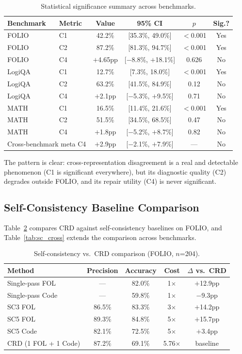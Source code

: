 \documentclass[11pt]{article}
\begin{document}
\begin{table}[t]
\centering
\caption{Statistical significance summary across benchmarks.}
\label{tab:significance}
\small
\begin{tabular}{llcccc}
\toprule
Benchmark & Metric & Value & 95\% CI & $p$ & Sig.? \\
\midrule
FOLIO  & C1 & 42.2\% & [35.3\%, 49.0\%] & $<$0.001 & Yes \\
FOLIO  & C2 & 87.2\% & [81.3\%, 94.7\%] & $<$0.001 & Yes \\
FOLIO  & C4 & $+$4.65pp & [$-$8.8\%, $+$18.1\%] & 0.626 & No \\
\midrule
LogiQA & C1 & 12.7\% & [7.3\%, 18.0\%] & $<$0.001 & Yes \\
LogiQA & C2 & 63.2\% & [41.5\%, 84.9\%] & 0.12 & No \\
LogiQA & C4 & $+$2.1pp & [$-$5.3\%, $+$9.5\%] & 0.71 & No \\
\midrule
MATH   & C1 & 16.5\% & [11.4\%, 21.6\%] & $<$0.001 & Yes \\
MATH   & C2 & 51.5\% & [34.5\%, 68.5\%] & 0.47 & No \\
MATH   & C4 & $+$1.8pp & [$-$5.2\%, $+$8.7\%] & 0.82 & No \\
\midrule
\multicolumn{2}{l}{Cross-benchmark meta C4} & $+$2.9pp & [$-$2.1\%, $+$7.9\%] & --- & No \\
\bottomrule
\end{tabular}
\end{table}

The pattern is clear: cross-representation disagreement is a real and detectable phenomenon (C1 is significant everywhere), but its diagnostic quality (C2) degrades outside FOLIO, and its repair utility (C4) is never significant.

\subsection{Self-Consistency Baseline Comparison}

Table~\ref{tab:sc_folio} compares CRD against self-consistency baselines on FOLIO, and Table~\ref{tab:sc_cross} extends the comparison across benchmarks.

\begin{table}[t]
\centering
\caption{Self-consistency vs.\ CRD comparison (FOLIO, $n$=204).}
\label{tab:sc_folio}
\begin{tabular}{lcccc}
\toprule
Method & Precision & Accuracy & Cost & $\Delta$ vs.\ CRD \\
\midrule
Single-pass FOL  & --- & 82.0\% & 1$\times$ & $+$12.9pp \\
Single-pass Code & --- & 59.8\% & 1$\times$ & $-$9.3pp \\
SC3 FOL          & 86.5\% & 83.3\% & 3$\times$ & $+$14.2pp \\
SC5 FOL          & 89.3\% & 84.8\% & 5$\times$ & $+$15.7pp \\
SC5 Code         & 82.1\% & 72.5\% & 5$\times$ & $+$3.4pp \\
CRD (1 FOL + 1 Code) & 87.2\% & 69.1\% & 5.76$\times$ & baseline \\
\bottomrule
\end{tabular}
\end{table}
\end{document}
